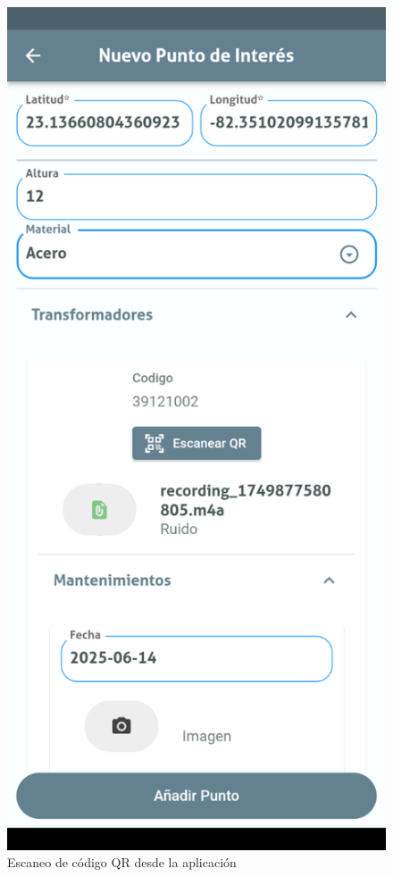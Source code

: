 \documentclass{article}
\begin{document}
\begin{figure}[H]
\begin{minipage}[b]{0.3\textwidth}
    \caption{Escaneo de código QR desde la aplicación}
    \label{fig:medias1}
  \end{minipage}
  \hspace{0.02\textwidth}
  \begin{minipage}[b]{0.3\textwidth}
    \centering
    \includegraphics[width=\textwidth]{images/functionality_test/medias_1.png}

\end{minipage}
\end{figure}
\end{document}
